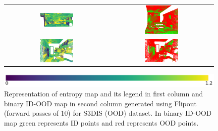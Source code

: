 \begin{figure}[h!]
\begin{tabular}{cc}
            \includegraphics[width=0.33\textwidth, height=0.18\textheight]{images/ood_imgs/fout_s3dis/pnt_1_fout_ent.pdf}& 
            \includegraphics[width=0.33\textwidth, height=0.18\textheight]{images/ood_imgs/fout_s3dis/fout_ent_3.pdf}\\

            \includegraphics[width=0.33\textwidth, height=0.18\textheight]{images/ood_imgs/fout_s3dis/ofc_42_fout_ent.pdf}& 
            \includegraphics[width=0.33\textwidth, height=0.18\textheight]{images/ood_imgs/fout_s3dis/fout_ent_1.pdf}\\
        \end{tabular}
        \includegraphics[scale=0.45]{images/ent_legend.pdf}
        \caption{Representation of entropy map and its legend in first column and binary ID-OOD map in second column generated using Flipout (forward passes of 10) for S3DIS (OOD) dataset. In binary ID-OOD map green represents ID points and red represents OOD points.}
        \label{fig:fout_s3dis_oodmap_ent}
    \end{figure}
    \FloatBarrier


